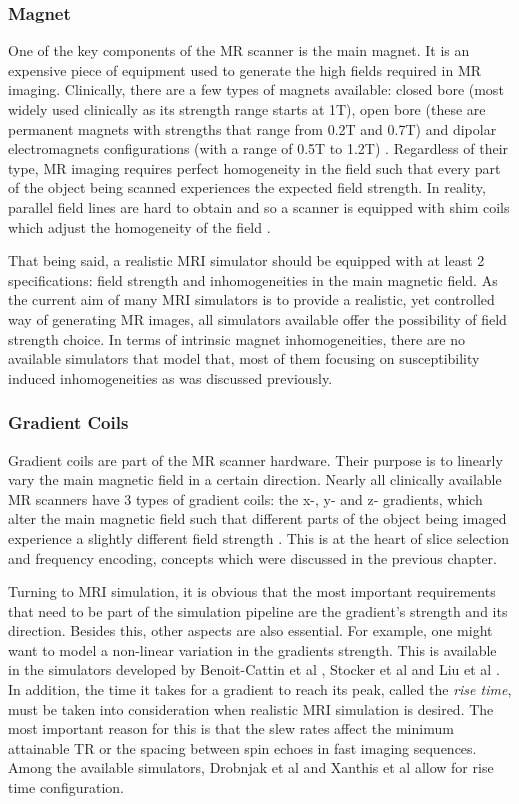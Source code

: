 \subsubsection{Magnet}
One of the key components of the MR scanner is the main magnet. It is an expensive piece of equipment used to generate the high fields required in MR imaging. Clinically, there are a few types of magnets available: closed bore (most widely used clinically as its strength range starts at 1T), open bore (these are permanent magnets with strengths that range from 0.2T and 0.7T) and dipolar electromagnets configurations (with a range of 0.5T to 1.2T) \cite{Morrow2000}. Regardless of their type, MR imaging requires perfect homogeneity in the field such that every part of the object being scanned experiences the expected field strength. In reality, parallel field lines are hard to obtain and so a scanner is equipped with shim coils which adjust the homogeneity of the field \cite{Romeo1984}.

That being said, a realistic MRI simulator should be equipped with at least 2 specifications: field strength and inhomogeneities in the main magnetic field. As the current aim of many MRI simulators is to provide a realistic, yet controlled way of generating MR images, all simulators available offer the possibility of field strength choice. In terms of intrinsic magnet inhomogeneities, there are no available simulators that model that, most of them focusing on susceptibility induced inhomogeneities as was discussed previously.

\subsubsection{Gradient Coils}
Gradient coils are part of the MR scanner hardware. Their purpose is to linearly vary the main magnetic field in a certain direction. Nearly all clinically available MR scanners have 3 types of gradient coils: the x-, y- and z- gradients, which alter the main magnetic field such that different parts of the object being imaged experience a slightly different field strength \cite{Hidalgo-Tobon2010}. This is at the heart of slice selection and frequency encoding, concepts which were discussed in the previous chapter. 

Turning to MRI simulation, it is obvious that the most important requirements that need to be part of the simulation pipeline are the gradient's strength and its direction. Besides this, other aspects are also essential. For example, one might want to model a non-linear variation in the gradients strength. This is available in the simulators developed by Benoit-Cattin et al \cite{Benoit-Cattin2005}, Stocker et al \cite{Stocker2010} and Liu et al \cite{Liu2013}. In addition, the time it takes for a gradient to reach its peak, called the \textit{rise time}, must be taken into consideration when realistic MRI simulation is desired. The most important reason for this is that the slew rates affect the minimum attainable TR or the spacing between spin echoes in fast imaging sequences. Among the available simulators, Drobnjak et al \cite{Drobnjak2006} and Xanthis et al \cite{Xanthis2014} allow for rise time configuration.

